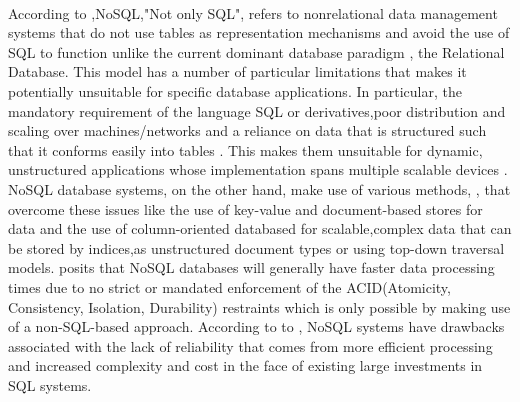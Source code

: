 \documentclass[12pt]{article}
\begin{document}
\paragraph{}
According to \cite{hossain13},NoSQL,"Not only SQL", refers to nonrelational data management systems that do not use tables as representation mechanisms and avoid the use of SQL to function unlike the current dominant database paradigm \citep{leavitt10}, the Relational Database. This model has a number of particular limitations that makes it potentially unsuitable for specific database applications. In particular, the mandatory requirement of the language SQL or derivatives,poor distribution and scaling over machines/networks and a reliance on data that is structured such that it conforms easily into tables \citep{leavitt10}. This makes them unsuitable for dynamic, unstructured applications whose implementation spans multiple scalable devices \cite{mcCreary14}. NoSQL database systems, on the other hand, make use of various methods, \citep{leavitt10}, that overcome these issues like the use of key-value and document-based stores for data and the use of column-oriented databased for scalable,complex data that can be stored by indices,as unstructured document types or using top-down traversal models. \citep{leavitt10} posits that NoSQL databases will generally have faster data processing times due to no strict or mandated enforcement of the ACID(Atomicity, Consistency, Isolation, Durability) restraints which is only possible by making use of a non-SQL-based approach. According to to \citep{leavitt10}, NoSQL systems have drawbacks associated with the lack of reliability that comes from more efficient processing and increased complexity and cost in the face of existing large investments in SQL systems.
\end{document}
